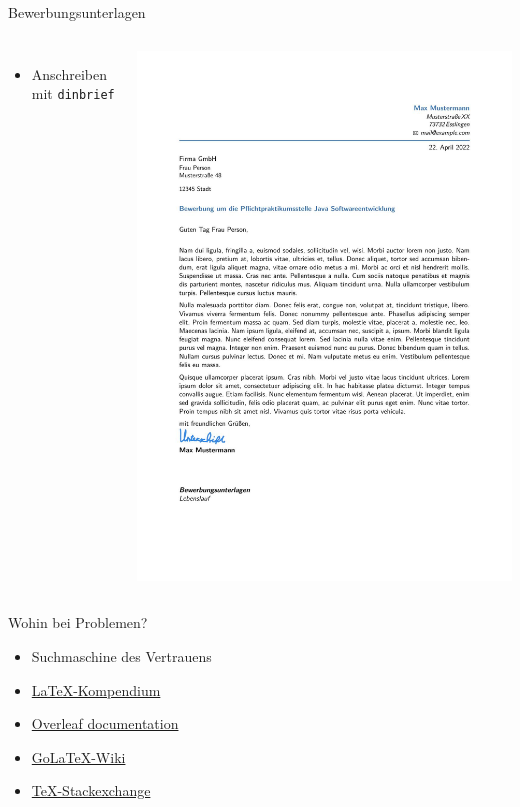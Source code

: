 \documentclass[presentation,aspectratio=169]{beamer}
\begin{document}
\begin{frame}[fragile]{Bewerbungsunterlagen}
\begin{columns}
      \centering
      \begin{itemize}
        \item Anschreiben mit \verb|dinbrief|
      \end{itemize}
      \includegraphics[height=.7\textheight]{Anschreiben}
  \end{columns}
\end{frame}

\begin{frame}{Wohin bei Problemen?}
  \begin{itemize}
    \item Suchmaschine des Vertrauens
    \item \href{https://de.wikibooks.org/wiki/LaTeX-Kompendium}{\LaTeX-Kompendium}
    \item \href{https://www.overleaf.com/learn}{Overleaf documentation}
    \item \href{https://golatex.de/wiki/index.php/Hauptseite}{Go\LaTeX-Wiki}
    \item \href{https://tex.stackexchange.com}{\TeX-Stackexchange}
  \end{itemize}
\end{frame}

\maketitle
\end{document}
